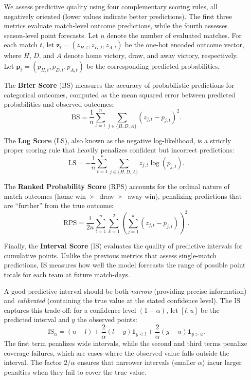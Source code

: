 We assess predictive quality using four complementary scoring rules, all negatively oriented (lower values indicate better predictions).
The first three metrics evaluate match-level outcome predictions, while the fourth assesses season-level point forecasts.
Let $n$ denote the number of evaluated matches.
For each match $t$, let $\mathbf{z}_t = (z_{H,t}, z_{D,t}, z_{A,t})$ be the one-hot encoded outcome vector, where $H$, $D$, and $A$ denote home victory, draw, and away victory, respectively.
Let $\mathbf{p}_t = (p_{H,t}, p_{D,t}, p_{A,t})$ be the corresponding predicted probabilities.

The \textbf{Brier Score} (BS) measures the accuracy of probabilistic predictions for categorical outcomes, computed as the mean squared error between predicted probabilities and observed outcomes:
\begin{equation}
    \text{BS} = \frac{1}{n} \sum_{t=1}^{n} \sum_{j \in \{H, D, A\}} (z_{j,t} - p_{j,t})^2.
    \label{eq:brier_score}
\end{equation}

The \textbf{Log Score} (LS), also known as the negative log-likelihood, is a strictly proper scoring rule that heavily penalizes confident but incorrect predictions:
\begin{equation}
    \text{LS} = -\dfrac{1}{n} \sum_{t=1}^{n} \sum_{j \in \{H, D, A\}} z_{j,t} \log(p_{j,t}).
    \label{eq:log_score}
\end{equation}

The \textbf{Ranked Probability Score} (RPS) accounts for the ordinal nature of match outcomes (home win $\succ$ draw $\succ$ away win), penalizing predictions that are ``further'' from the true outcome:
\begin{equation}
    \text{RPS} = \dfrac{1}{2n} \sum_{t=1}^{n} \sum_{k=1}^{2} \left( \sum_{j=1}^{k} (z_{j,t} - p_{j,t}) \right)^2.
    \label{eq:rps}
\end{equation}

Finally, the \textbf{Interval Score} (IS) evaluates the quality of predictive intervals for cumulative points.
Unlike the previous metrics that assess single-match predictions, IS measures how well the model forecasts the range of possible point totals for each team at future match-days.

A good predictive interval should be both \emph{narrow} (providing precise information) and \emph{calibrated} (containing the true value at the stated confidence level).
The IS captures this trade-off: for a confidence level $(1-\alpha)$, let $[l, u]$ be the predicted interval and $y$ the observed points:
\begin{equation}
    \text{IS}_\alpha = (u - l) + \frac{2}{\alpha}(l - y)\mathbf{1}_{y < l} + \frac{2}{\alpha}(y - u)\mathbf{1}_{y > u}.
    \label{eq:interval_score}
\end{equation}
The first term penalizes wide intervals, while the second and third terms penalize coverage failures, which are cases where the observed value falls outside the interval.
The factor $2/\alpha$ ensures that narrower intervals (smaller $\alpha$) incur larger penalties when they fail to cover the true value.


